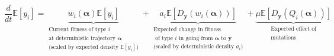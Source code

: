 \begin{equation}
\label{nD_moment_eqn_mean_replicator}
\frac{d}{dt}\mathbb{E}[y_i] = \underbrace{w_i(\boldsymbol{\alpha})\mathbb{E}[y_i]}_{\substack{\text{Current fitness of type $i$} \\ \text{at deterministic trajectory $\boldsymbol{\alpha}$} \\ \text{(scaled by expected density $\mathbb{E}[y_i]$)}}} + \underbrace{a_i\mathbb{E}[D_{\mathbf{y}}(w_i(\boldsymbol{\alpha}))]}_{\substack{\text{Expected change in fitness} \\ \text{ of type $i$ in going from $\boldsymbol{\alpha}$ to $\mathbf{y}$} \\ \text{(scaled by deterministic density $a_i$)}}} + \underbrace{\mu\mathbb{E}[D_{\mathbf{y}}(Q_i(\boldsymbol{\alpha}))]}_{\substack{\text{Expected effect of} \\ \text{mutations}}}
\end{equation}

